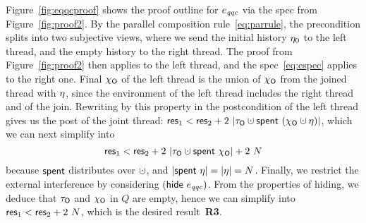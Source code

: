 Figure~\ref{fig:eqqcproof} shows the proof outline for $e_{\mathit{qqc}}$ via the
spec from Figure~\ref{fig:proof2}.
%
By the parallel composition rule~\eqref{eq:parrule}, the precondition
splits into two subjective views, where we send the initial history
$\eta_0$ to the left thread, and the empty history to the right
thread. The proof from Figure~\ref{fig:proof2} then applies to the
left thread, and the spec~\eqref{eq:espec} applies to the right
one. Final $\chi_{\mathsf{O}}$ of the left thread is the union of $\chi_{\mathsf{O}}$ from
the joined thread with $\eta$, since the environment of the left
thread includes the right thread and of the join. Rewriting by this
property in the postcondition of the left thread gives us the post of
the joint thread: $\res_1 < \res_2 +2\ |\tkno \hunion \Tomb~(\histo
\hunion \gist)|$, which we can next simplify into
\[
\res_1 < \res_2 + 2\ |\tkno \hunion \Tomb~\histo| + 2\ N
\]
because $\mathsf{spent}$ distributes over $\hunion$, and $|\mathsf{spent}~\eta| =
|\eta| = N$. Finally, we restrict the external interference by
considering $(\mathsf{hide}~e_{\mathit{qqc}})$. From the properties of hiding,
we deduce that $\tau_{\mathsf{O}}$ and $\chi_{\mathsf{O}}$ in $Q$ are empty, hence we can
simplify into $\mathsf{res}_1 < \mathsf{res}_2 + 2 \ N$, which is the desired
result~\textbf{R3}.
%
